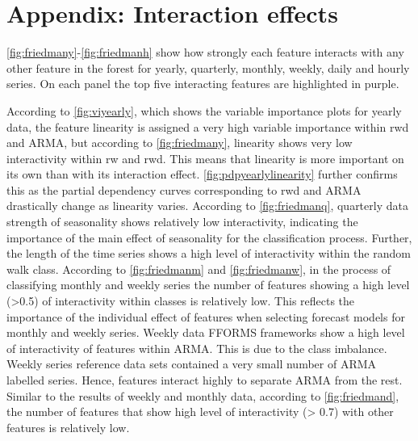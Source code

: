 \documentclass[11pt,a4paper,]{article}
\begin{document}
\hypertarget{appendix-interaction-effects}{%
\section*{Appendix: Interaction effects}\label{appendix-interaction-effects}}

\autoref{fig:friedmany}-\autoref{fig:friedmanh} show how strongly each feature interacts with any other feature in the forest for yearly, quarterly, monthly, weekly, daily and hourly series. On each panel the top five interacting features are highlighted in purple.

According to \autoref{fig:viyearly}, which shows the variable importance plots for yearly data, the feature linearity is assigned a very high variable importance within rwd and ARMA, but according to \autoref{fig:friedmany}, linearity shows very low interactivity within rw and rwd. This means that linearity is more important on its own than with its interaction effect. \autoref{fig:pdpyearlylinearity} further confirms this as the partial dependency curves corresponding to rwd and ARMA drastically change as linearity varies. According to \autoref{fig:friedmanq}, quarterly data strength of seasonality shows relatively low interactivity, indicating the importance of the main effect of seasonality for the classification process. Further, the length of the time series shows a high level of interactivity within the random walk class. According to \autoref{fig:friedmanm} and \autoref{fig:friedmanw}, in the process of classifying monthly and weekly series the number of features showing a high level (\textgreater{}0.5) of interactivity within classes is relatively low. This reflects the importance of the individual effect of features when selecting forecast models for monthly and weekly series. Weekly data FFORMS frameworks show a high level of interactivity of features within ARMA. This is due to the class imbalance. Weekly series reference data sets contained a very small number of ARMA labelled series. Hence, features interact highly to separate ARMA from the rest. Similar to the results of weekly and monthly data, according to \autoref{fig:friedmand}, the number of features that show high level of interactivity (\textgreater{} 0.7) with other features is relatively low.
\end{document}
